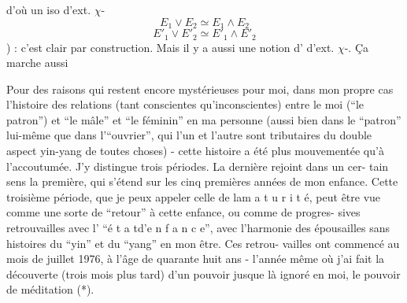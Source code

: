 d'où un iso d'ext. $\chi$-
\[
 E_1\vee E_2\simeq E_1\wedge E_2
\]
\[
 E'_1\vee E'_2\simeq E'_1\wedge E'_2
\]
 ) : c'est clair par construction.
Mais il y a aussi une notion d' d'ext. $\chi$-. Ça marche aussi

Pour des raisons qui restent encore mystérieuses pour moi, dans mon propre
cas l'histoire des relations (tant conscientes qu'inconscientes) entre le moi
(``le patron'')\inserted{,} et ``le mâle'' et ``le féminin'' en ma personne (aussi bien dans le
``patron'' lui-même que dans l'``ouvrier'', qui l'un et l'autre sont tributaires du
double aspect yin-yang de toutes choses) - cette histoire a été plus mouvementée
qu'à l'accoutumée. J'y distingue trois périodes. La dernière rejoint dans un cer-\newline
tain sens la première, qui s'étend sur les cinq premières années de mon enfance.
Cette troisième période, que je peux appeler celle de la\quad m a t u r i t é\quad,
peut être vue comme une sorte de ``retour'' à cette enfance, ou comme de progres-\newline
sives retrouvailles avec l' ``é t a t\quad d'\quad e n f a n c e'', avec l'harmonie
des épousailles sans histoires du ``yin'' et du ``yang'' en mon être. Ces retrou-\newline
vailles ont commencé au mois de juillet 1976, à l'âge de quarante huit ans -
l'année même où j'ai fait la découverte (trois mois plus tard) d'un pouvoir
jusque là ignoré en moi, le pouvoir de méditation (*).

